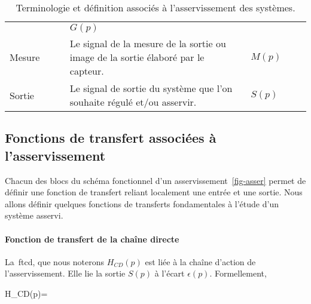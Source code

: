 \begin{table}[!h]
\begin{tabular}{@{}P{0.2\linewidth}m{0.6\linewidth}P{0.2\linewidth}@{}}
                & $G(p)$                                                \\
Mesure          & Le signal de la mesure de la sortie ou image de la sortie
                  élaboré par le capteur.
                & $M(p)$                                                \\
Sortie          & Le signal de sortie du système que l'on souhaite 
                  régulé et/ou asservir.
                & $S(p)$                                                \\
        \bottomrule
    \end{tabular}
    \caption{Terminologie et définition associés à l'asservissement des 
             systèmes.\label{tab-asser}}
\end{table}
\subsection{Fonctions de transfert associées à l'asservissement}
Chacun des blocs du schéma fonctionnel d'un asservissement~\cref{fig-asser} 
permet de définir une fonction de transfert reliant localement une entrée 
et une sortie.
Nous allons définir quelques fonctions de transferts fondamentales à 
l'étude d'un système asservi.
\paragraph{Fonction de transfert de la chaîne directe}
La~\gls{ftcd}, que nous noterons $H_{CD}(p)$ est liée à 
la chaîne d'action de l'asservissement. Elle lie la sortie $S(p)$ à 
l'écart $\epsilon(p)$. Formellement,
\begin{bequation}
H_{CD}(p)=
\end{bequation}
